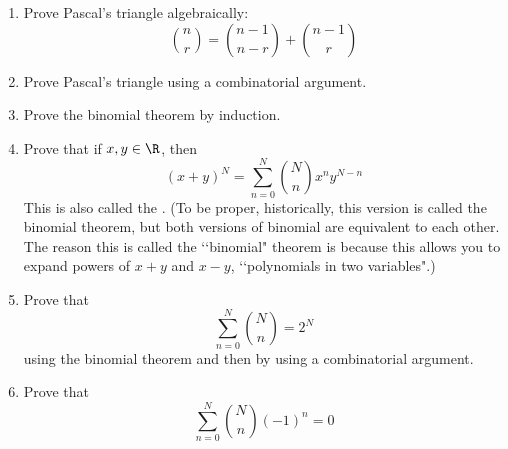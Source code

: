   \mbox{}
  \begin{enumerate}[nosep,label=(\alph*)]
    \item Prove Pascal's triangle algebraically:
      \[
        \binom{n}{r} = \binom{n-1}{n-r} + \binom{n-1}{r}
      \]
    \item Prove Pascal's triangle using a combinatorial argument.
    \item Prove the binomial theorem by induction.
    \item Prove that if $x,y\in \R$, then
      \[
        (x + y)^N = \sum_{n=0}^{N} \binom{N}{n} x^n y^{N-n}
      \]
      This is also called the .
      (To be proper, historically, this version is called the binomial theorem,
      but both versions of binomial are equivalent to each other.
      The reason this is called the \lq\lq binomial" theorem is because
      this allows you to expand powers of $x + y$ and $x - y$, \lq\lq polynomials
      in two variables".)
    \item Prove that
      \[
        \sum_{n=0}^{N} \binom{N}{n} = 2^N
      \]
      using the binomial theorem and then by using a combinatorial argument.
    \item Prove that
      \[
        \sum_{n=0}^{N} \binom{N}{n}(-1)^n = 0
      \]
  \end{enumerate}
